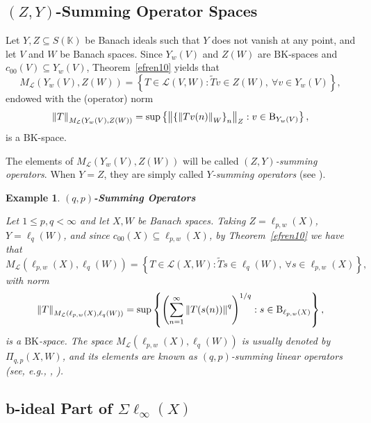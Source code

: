 \documentclass[14pt, a4paper]{article}  %
\providecommand{\llave}[1]{\left\lbrace #1\right\rbrace }
\providecommand{\norm}[1]{\left\lVert#1\right\rVert}
\newcommand{\K}{\mathbb{K}}
\newcommand{\BK}{\text{BK}}
\newcommand{\B}{\textup{B}}
\newtheorem{example}{Example}[section]  %
\begin{document}
 
		

 \subsection{$(Z,Y)$-Summing Operator Spaces}
 
 Let $Y,Z\subseteq S(\K)$ be Banach ideals such that $Y$ does not vanish at any point, and let $V$ and $W$ be Banach spaces. Since $Y_w(V)$ and $Z(W)$ are $\BK$-spaces and $c_{00}(V)\subseteq Y_w(V)$, Theorem~\ref{efren10} yields that
 \begin{equation}\label{naty19}
 	M_{\mathcal L}(Y_w(V),Z(W))
 	=\llave{T\in\mathcal L(V,W):\widetilde{T}v\in Z(W),\ \forall v\in Y_w(V)},
 \end{equation}
 endowed with the (operator) norm
 \begin{equation}
 	\norm{T}_{M_{\mathcal L}(Y_w(V),Z(W))}
 	=\sup\llave{\norm{\llave{\norm{Tv(n)}_W}_n}_{Z}:v\in\B_{Y_w(V)}},
 \end{equation}
 is a $\BK$-space.
 
 The elements of $M_{\mathcal L}(Y_w(V),Z(W))$ will be called \emph{$(Z,Y)$-summing operators}. When $Y=Z$, they are simply called \emph{$Y$-summing operators} (see \cite[Sec.~6]{HG}).
 
 
 
 \begin{example} \textbf{$(q,p)$-Summing Operators}
 	
 	Let $1\le p,q<\infty$ and let $X,W$ be Banach spaces. Taking $Z=\ell_{p,w}(X)$, $Y=\ell_q(W)$, and since $c_{00}(X)\subseteq \ell_{p,w}(X)$, by Theorem~\ref{efren10} we have that
 	\begin{equation}
 		M_{\mathcal L}(\ell_{p,w}(X),\ell_q(W))
 		=\llave{T\in\mathcal L(X,W):\widetilde{T}s\in\ell_q(W),\ \forall s\in\ell_{p,w}(X)},
 	\end{equation}
 	with norm
 	\begin{equation}
 		\norm{T}_{M_{\mathcal L}(\ell_{p,w}(X),\ell_q(W))}
 		=\sup\llave{\left(\sum_{n=1}^{\infty}\norm{T(s(n))}^{q}\right)^{1/q}:s\in\B_{\ell_{p,w}(X)}},
 	\end{equation}
 	is a $\BK$-space. The space $M_{\mathcal L}(\ell_{p,w}(X),\ell_q(W))$ is usually denoted by $\Pi_{q,p}(X,W)$, and its elements are known as \emph{$(q,p)$-summing linear operators}  (see, e.g., \cite{P}, \cite[Ch.~10]{DJT}).
 \end{example}

\subsection{b-ideal  Part of $\Sigma \ell_{\infty}(X)$} 
\end{document}
